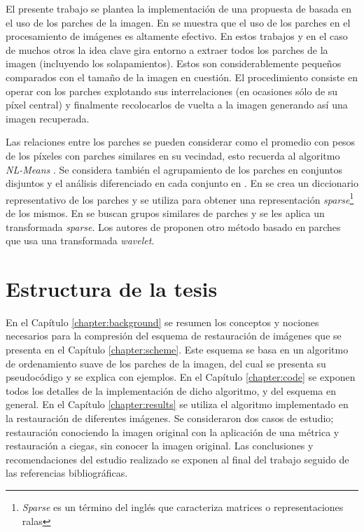 El presente trabajo se plantea la implementaci\'on de una propuesta de \II basada en el uso de los parches de la imagen. En \cite{buades2005review,chatterjee2009clustering,yu2010image,yu2011solving,dong2011image,dong2011sparsity,zoran2011learning,elad2006image,mairal2007sparse,mairal2009non,zeyde2010single,dabov2007image,li2008patch} se muestra que el uso de los parches en el procesamiento de im\'agenes es altamente efectivo. En estos trabajos y en el caso de muchos otros la idea clave gira entorno a extraer todos los parches de la imagen (incluyendo los solapamientos). Estos son considerablemente pequeños comparados con el tamaño de la imagen en cuesti\'on. El procedimiento consiste en operar con los parches explotando sus interrelaciones (en ocasiones s\'olo de su p\'ixel central) y finalmente recolocarlos de vuelta a la imagen generando as\'i una imagen recuperada.

Las relaciones entre los parches se pueden considerar como el promedio con pesos de los p\'ixeles con parches similares en su vecindad, esto recuerda al algoritmo \textit{NL-Means} \cite{buades2005review}. Se considera tambi\'en el agrupamiento de los parches en conjuntos disjuntos y el análisis diferenciado en cada conjunto en \cite{chatterjee2009clustering,yu2010image,yu2011solving,dong2011image,dong2011sparsity,zoran2011learning}. En \cite{elad2006image,mairal2007sparse,mairal2009non,zeyde2010single} se crea un diccionario representativo de los parches y se utiliza para obtener una representaci\'on \textit{sparse}\footnote{\textit{Sparse} es un término del inglés que caracteriza matrices o representaciones ralas} de los mismos. En \cite{mairal2009non,dabov2007image,li2008patch} se buscan grupos similares de parches y se les aplica un transformada \textit{sparse}. Los autores de \cite{ram2011generalized,ram2012redundant} proponen otro m\'etodo basado en parches que usa una transformada \textit{wavelet}.

\section*{Estructura de la tesis}

En el Cap\'itulo \ref{chapter:background} se resumen los conceptos y nociones necesarios para la compresi\'on del esquema de restauraci\'on de im\'agenes que se presenta en el Cap\'itulo \ref{chapter:scheme}. Este esquema se basa en un algoritmo de ordenamiento suave de los parches de la imagen, del cual se presenta su pseudoc\'odigo y se explica con ejemplos. En el Cap\'itulo \ref{chapter:code} se exponen todos los detalles de la implementaci\'on de dicho algoritmo, y del esquema en general. En el Cap\'itulo \ref{chapter:results} se utiliza el algoritmo implementado en la restauración de diferentes imágenes. Se consideraron dos casos de estudio; restauración conociendo la imagen original con la aplicación de una métrica y restauración a ciegas, sin conocer la imagen original. Las conclusiones y recomendaciones del estudio realizado se exponen al final del trabajo seguido de las referencias bibliográficas.
